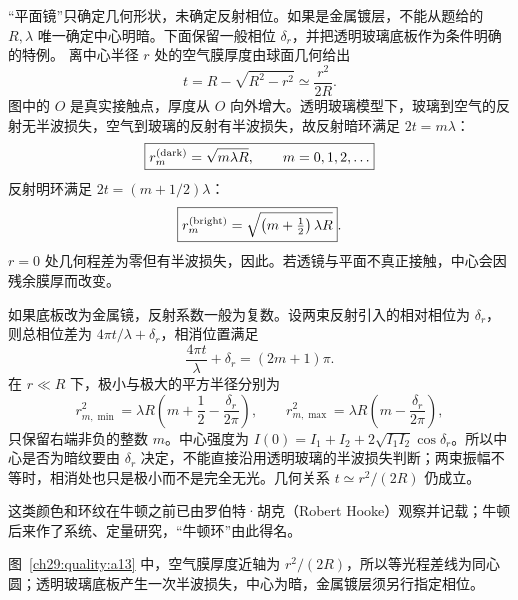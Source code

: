 \begin{xesolution}
\begin{center}\begin{minipage}{.96\linewidth}\centering
{}
\end{minipage}\end{center}

“平面镜”只确定几何形状，未确定反射相位。如果是金属镀层，不能从题给的 $R,\lambda$ 唯一确定中心明暗。下面保留一般相位 $\delta_r$，并把透明玻璃底板作为条件明确的特例。
离中心半径 $r$ 处的空气膜厚度由球面几何给出
\[
 t=R-\sqrt{R^2-r^2}\simeq\frac{r^2}{2R}.
\]
图中的 $O$ 是真实接触点，厚度从 $O$ 向外增大。透明玻璃模型下，玻璃到空气的反射无半波损失，空气到玻璃的反射有半波损失，故反射暗环满足 $2t=m\lambda$：
\[
 \boxed{r_m^{(\rm dark)}=\sqrt{m\lambda R},\qquad m=0,1,2,\ldots}
\]
反射明环满足 $2t=(m+1/2)\lambda$：
\[
 \boxed{r_m^{(\rm bright)}=\sqrt{\left(m+\tfrac12\right)\lambda R}}.
\]
$r=0$ 处几何程差为零但有半波损失，因此。若透镜与平面不真正接触，中心会因残余膜厚而改变。

如果底板改为金属镜，反射系数一般为复数。设两束反射引入的相对相位为 $\delta_r$，则总相位差为 $4\pi t/\lambda+\delta_r$，相消位置满足
\[
 \frac{4\pi t}{\lambda}+\delta_r=(2m+1)\pi.
\]
在 $r\ll R$ 下，极小与极大的平方半径分别为
\[
 r_{m,\min}^2=\lambda R\left(m+\frac12-\frac{\delta_r}{2\pi}\right),\qquad
 r_{m,\max}^2=\lambda R\left(m-\frac{\delta_r}{2\pi}\right),
\]
只保留右端非负的整数 $m$。中心强度为 $I(0)=I_1+I_2+2\sqrt{I_1I_2}\cos\delta_r$。所以中心是否为暗纹要由 $\delta_r$ 决定，不能直接沿用透明玻璃的半波损失判断；两束振幅不等时，相消处也只是极小而不是完全无光。几何关系 $t\simeq r^2/(2R)$ 仍成立。

这类颜色和环纹在牛顿之前已由罗伯特·胡克（Robert Hooke）观察并记载；牛顿后来作了系统、定量研究，“牛顿环”由此得名。

图~\ref{ch29:quality:a13} 中，空气膜厚度近轴为 $r^2/(2R)$，所以等光程差线为同心圆；透明玻璃底板产生一次半波损失，中心为暗，金属镀层须另行指定相位。
\end{xesolution}

